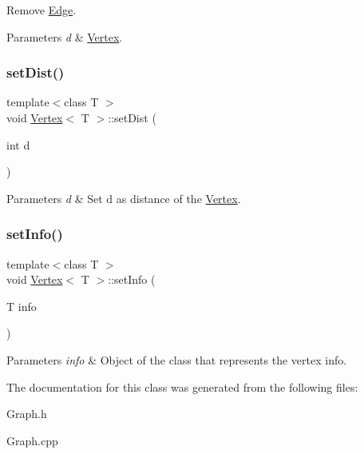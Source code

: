 Remove \hyperlink{class_edge}{Edge}. 


\begin{DoxyParams}{Parameters}
{\em d} & \hyperlink{class_vertex}{Vertex}. \\
\hline
\end{DoxyParams}
\mbox{\label{class_vertex_aeb33d223aa111db88df4151f282b0a86}} 
\subsubsection{\texorpdfstring{set\+Dist()}{setDist()}}
{\footnotesize\ttfamily template$<$class T $>$ \\
void \hyperlink{class_vertex}{Vertex}$<$ T $>$\+::set\+Dist (\begin{DoxyParamCaption}\item[{int}]{d }\end{DoxyParamCaption})}


\begin{DoxyParams}{Parameters}
{\em d} & Set d as distance of the \hyperlink{class_vertex}{Vertex}. \\
\hline
\end{DoxyParams}
\mbox{\label{class_vertex_a31cd60c26640f8072a928ba70eb2f95e}} 
\subsubsection{\texorpdfstring{set\+Info()}{setInfo()}}
{\footnotesize\ttfamily template$<$class T $>$ \\
void \hyperlink{class_vertex}{Vertex}$<$ T $>$\+::set\+Info (\begin{DoxyParamCaption}\item[{T}]{info }\end{DoxyParamCaption})}


\begin{DoxyParams}{Parameters}
{\em info} & Object of the class that represents the vertex info. \\
\hline
\end{DoxyParams}


The documentation for this class was generated from the following files\+:\begin{DoxyCompactItemize}
\item 
Graph.\+h\item 
Graph.\+cpp\end{DoxyCompactItemize}
